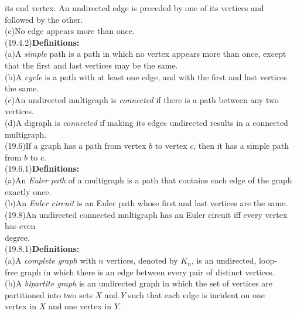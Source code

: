 \documentclass{amsart}
\newcommand{\lgap}{2pt}                             %
\newcommand{\llgap}{6pt}                            %
\begin{document}
\begin{tabbing}
      \>   \>its end vertex. An undirected edge is preceded by one of its vertices and\\[\lgap]
      \>   \>followed by the other.\\[\lgap]
      \>(c)\>No edge appears more than once.\\[\llgap]
(19.4.2)\>\textbf{Definitions:}\\[\lgap]
      \>(a)\>A \emph{simple} path is a path in which no vertex appears more than once, except\\[\lgap]
      \>   \>that the first and last vertices may be the same.\\[\lgap]
      \>(b)\>A \emph{cycle} is a path with at least one edge, and with the first and last vertices\\[\lgap]
      \>   \>the same.\\[\lgap]
      \>(c)\>An undirected multigraph is \emph{connected} if there is a path between any two\\[\lgap]
      \>   \>vertices.\\[\lgap]
      \>(d)\>A digraph is \emph{connected} if making its edges undirected results in a connected\\[\lgap]
      \>   \>multigraph.\\[\llgap]
(19.6)\>If a graph has a path from vertex $b$ to vertex $c$, then it has a simple path from $b$ to $c$.\\[\llgap]
(19.6.1)\>\textbf{Definitions:}\\[\lgap]
      \>(a)\>An \emph{Euler path} of a multigraph is a path that contains each edge of the graph\\[\lgap]
      \>   \>exactly once.\\[\lgap]
      \>(b)\>An \emph{Euler circuit} is an Euler path whose first and last vertices are the same.\\[\llgap]
(19.8)\>An undirected connected multigraph has an Euler circuit iff every vertex has even\\[\lgap]
      \>degree.\\[\llgap]
(19.8.1)\>\textbf{Definitions:}\\[\lgap]
      \>(a)\>A \emph{complete graph} with $n$ vertices, denoted by $K_{n}$, is an undirected, loop-\\[\lgap]
      \>   \>free graph in which there is an edge between every pair of distinct vertices.\\[\lgap]
      \>(b)\>A \emph{bipartite graph} is an undirected graph in which the set of vertices are\\[\lgap]
      \>   \>partitioned into two sets $X$ and $Y$ such that each edge is incident on one\\[\lgap]
      \>   \>vertex in $X$ and one vertex in $Y$.\\[\llgap]
\end{tabbing}
\end{document}
